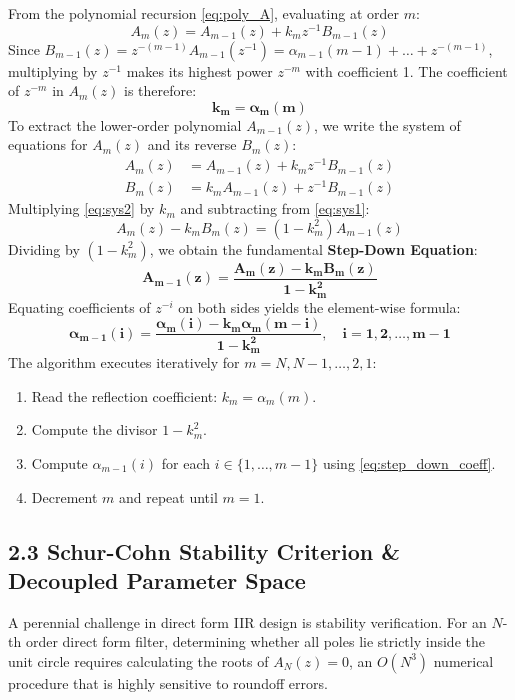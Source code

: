 \documentclass[11pt,a4paper]{article}
\begin{document}
From the polynomial recursion \eqref{eq:poly_A}, evaluating at order $m$:
\begin{equation}
A_m(z) = A_{m-1}(z) + k_m z^{-1} B_{m-1}(z)
\end{equation}
Since $B_{m-1}(z) = z^{-(m-1)} A_{m-1}(z^{-1}) = \alpha_{m-1}(m-1) + \dots + z^{-(m-1)}$, multiplying by $z^{-1}$ makes its highest power $z^{-m}$ with coefficient 1. The coefficient of $z^{-m}$ in $A_m(z)$ is therefore:
\begin{equation}
\mathbf{k_m = \alpha_m(m)}
\label{eq:km_ident}
\end{equation}
To extract the lower-order polynomial $A_{m-1}(z)$, we write the system of equations for $A_m(z)$ and its reverse $B_m(z)$:
\begin{align}
A_m(z) &= A_{m-1}(z) + k_m z^{-1} B_{m-1}(z) \label{eq:sys1} \\
B_m(z) &= k_m A_{m-1}(z) + z^{-1} B_{m-1}(z) \label{eq:sys2}
\end{align}
Multiplying \eqref{eq:sys2} by $k_m$ and subtracting from \eqref{eq:sys1}:
\begin{equation}
A_m(z) - k_m B_m(z) = (1 - k_m^2) A_{m-1}(z)
\end{equation}
Dividing by $(1 - k_m^2)$, we obtain the fundamental \textbf{Step-Down Equation}:
\begin{equation}
\mathbf{A_{m-1}(z) = \frac{A_m(z) - k_m B_m(z)}{1 - k_m^2}}
\label{eq:step_down_poly}
\end{equation}
Equating coefficients of $z^{-i}$ on both sides yields the element-wise formula:
\begin{equation}
\mathbf{\alpha_{m-1}(i) = \frac{\alpha_m(i) - k_m \alpha_m(m - i)}{1 - k_m^2}, \quad i = 1, 2, \dots, m-1}
\label{eq:step_down_coeff}
\end{equation}
The algorithm executes iteratively for $m = N, N-1, \dots, 2, 1$:
\begin{enumerate}
    \item Read the reflection coefficient: $k_m = \alpha_m(m)$.
    \item Compute the divisor $1 - k_m^2$.
    \item Compute $\alpha_{m-1}(i)$ for each $i \in \{1, \dots, m-1\}$ using \eqref{eq:step_down_coeff}.
    \item Decrement $m$ and repeat until $m=1$.
\end{enumerate}

\subsection{2.3 Schur-Cohn Stability Criterion \& Decoupled Parameter Space}
A perennial challenge in direct form IIR design is stability verification. For an $N$-th order direct form filter, determining whether all poles lie strictly inside the unit circle requires calculating the roots of $A_N(z) = 0$, an $O(N^3)$ numerical procedure that is highly sensitive to roundoff errors.
\end{document}
